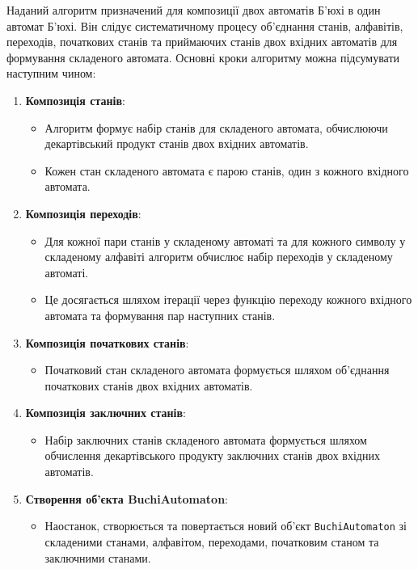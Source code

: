 \documentclass[12pt,a4paper]{article}
\begin{document}
Наданий алгоритм призначений для композиції двох автоматів Б'юхі в один автомат Б'юхі. Він слідує систематичному процесу об'єднання станів, алфавітів, переходів, початкових станів та приймаючих станів двох вхідних автоматів для формування складеного автомата. Основні кроки алгоритму можна підсумувати наступним чином:

\begin{enumerate}
    \item \textbf{Композиція станів}:
    \begin{itemize}
        \item Алгоритм формує набір станів для складеного автомата, обчислюючи декартівський продукт станів двох вхідних автоматів.
        \item Кожен стан складеного автомата є парою станів, один з кожного вхідного автомата.
    \end{itemize}

    \item \textbf{Композиція переходів}:
    \begin{itemize}
        \item Для кожної пари станів у складеному автоматі та для кожного символу у складеному алфавіті алгоритм обчислює набір переходів у складеному автоматі.
        \item Це досягається шляхом ітерації через функцію переходу кожного вхідного автомата та формування пар наступних станів.
    \end{itemize}

    \item \textbf{Композиція початкових станів}:
    \begin{itemize}
        \item Початковий стан складеного автомата формується шляхом об'єднання початкових станів двох вхідних автоматів.
    \end{itemize}

    \item \textbf{Композиція заключних станів}:
    \begin{itemize}
        \item Набір заключних станів складеного автомата формується шляхом обчислення декартівського продукту заключних станів двох вхідних автоматів.
    \end{itemize}

    \item \textbf{Створення об'єкта BuchiAutomaton}:
    \begin{itemize}
        \item Наостанок, створюється та повертається новий об'єкт \texttt{BuchiAutomaton} зі складеними станами, алфавітом, переходами, початковим станом та заключними станами.
    \end{itemize}
\end{enumerate}
\end{document}
